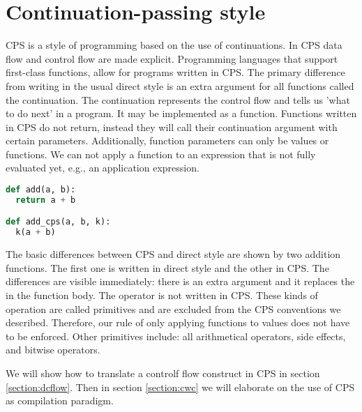
\chapter{\label{chap:cps}Continuation-passing style}
\ac{CPS}\autocite{steel1975scheme} is a style of programming based on the use of continuations. In \ac{CPS} data flow and control flow are made explicit. Programming languages that support first-class functions, allow for programs written in \ac{CPS}. The primary difference from writing in the usual direct style is an extra argument for all functions called the continuation. The continuation represents the control flow and tells us 'what to do next' in a program. It may be implemented as a function. Functions written in \ac{CPS} do not return, instead they will call their continuation argument with certain parameters. Additionally, function parameters can only be values or functions. We can not apply a function to an expression that is not fully evaluated yet, e.g., an application expression. 

\begin{lstlisting}[language=Python]
def add(a, b):
  return a + b

def add_cps(a, b, k):
  k(a + b)           
\end{lstlisting}

The basic differences between \ac{CPS} and direct style are shown by two addition functions. The first one is written in direct style and the other in \ac{CPS}. The differences are visible immediately: there is an extra argument  and it replaces the  in the function body. The \lstinlineb{+} operator is not written in \ac{CPS}. These kinds of operation are called primitives and are excluded from the \ac{CPS} conventions we described. Therefore, our rule of only applying functions to values does not have to be enforced. Other primitives include: all arithmetical operators, side effects, and bitwise operators.

We will show how to translate a controlf flow construct in \ac{CPS} in section \ref{section:dcflow}. Then in section \ref{section:cwc} we will elaborate on the use of \ac{CPS} as compilation paradigm.

